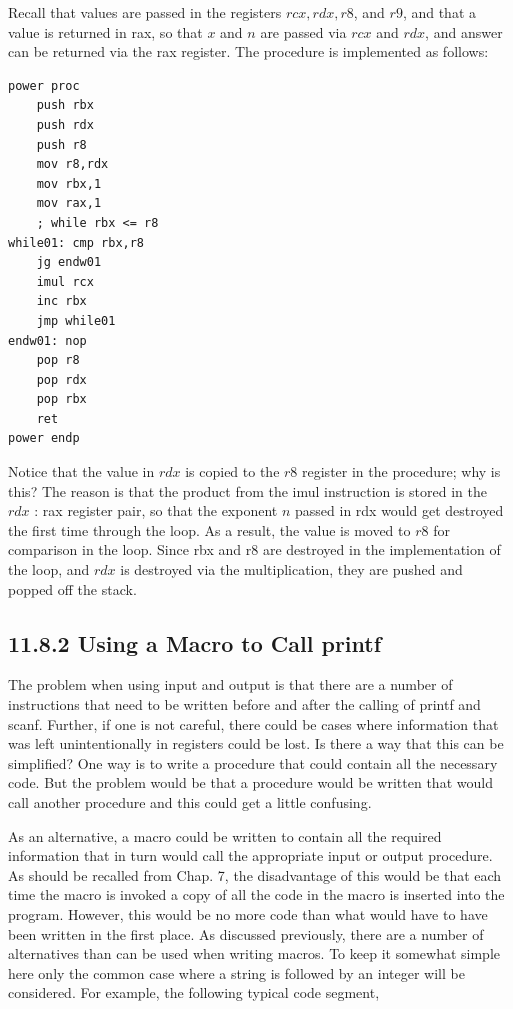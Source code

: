 \documentclass[10pt]{article}
\begin{document}
Recall that values are passed in the registers $r c x, r d x, r 8$, and $r 9$, and that a value is returned in rax, so that $x$ and $n$ are passed via $r c x$ and $r d x$, and answer can be returned via the rax register. The procedure is implemented as follows:

\begin{verbatim}
power proc
    push rbx
    push rdx
    push r8
    mov r8,rdx
    mov rbx,1
    mov rax,1
    ; while rbx <= r8
while01: cmp rbx,r8
    jg endw01
    imul rcx
    inc rbx
    jmp while01
endw01: nop
    pop r8
    pop rdx
    pop rbx
    ret
power endp
\end{verbatim}

Notice that the value in $r d x$ is copied to the $r 8$ register in the procedure; why is this? The reason is that the product from the imul instruction is stored in the $r d x$ : rax register pair, so that the exponent $n$ passed in rdx would get destroyed the first time through the loop. As a result, the value is moved to $r 8$ for comparison in the loop. Since rbx and r8 are destroyed in the implementation of the loop, and $r d x$ is destroyed via the multiplication, they are pushed and popped off the stack.

\subsection*{11.8.2 Using a Macro to Call printf}
The problem when using input and output is that there are a number of instructions that need to be written before and after the calling of printf and scanf. Further, if one is not careful, there could be cases where information that was left unintentionally in registers could be lost. Is there a way that this can be simplified? One way is to write a procedure that could contain all the necessary code. But the problem would be that a procedure would be written that would call another procedure and this could get a little confusing.

As an alternative, a macro could be written to contain all the required information that in turn would call the appropriate input or output procedure. As should be recalled from Chap. 7, the disadvantage of this would be that each time the macro is invoked a copy of all the code in the macro is inserted into the program. However, this would be no more code than what would have to have been written in the first place. As discussed previously, there are a number of alternatives than can be used when writing macros. To keep it somewhat simple here only the common case where a string is followed by an integer will be considered. For example, the following typical code segment,
\end{document}
